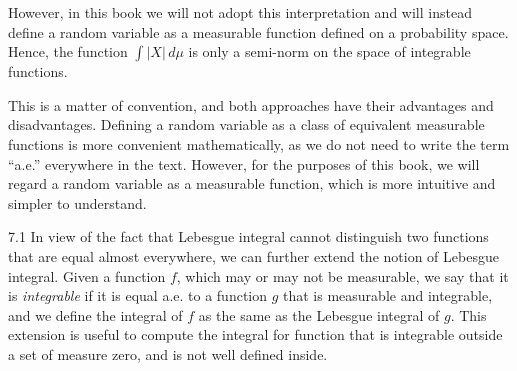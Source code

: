 However, in this book we will not adopt this interpretation and will instead define a random variable as a measurable function defined on a probability space. Hence, the function $\int |X|\, d\mu$ is only a semi-norm on the space of integrable functions.

This is a matter of convention, and both approaches have their advantages and disadvantages. Defining a random variable as a class of equivalent measurable functions is more convenient mathematically, as we do not need to write the term ``a.e.'' everywhere in the text. However, for the purposes of this book, we will regard a random variable as a measurable function, which is more intuitive and simpler to understand.

\begin{remarkbox}{7.1}
In view of the fact that Lebesgue integral cannot distinguish two functions that are equal almost everywhere, we can further extend the notion of Lebesgue integral. Given a function $f$, which may or may not be measurable, we say that it is \textit{integrable} if it is equal a.e. to a function $g$ that is measurable and integrable, and we define the integral of $f$ as the same as the Lebesgue integral of $g$. This extension is useful to compute the integral for function that is integrable outside a set of measure zero, and is not well defined inside.
\end{remarkbox}
